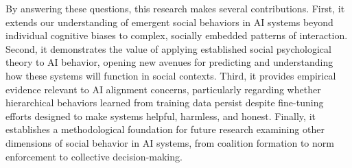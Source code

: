 
By answering these questions, this research makes several contributions. First, it extends our understanding of emergent social behaviors in AI systems beyond individual cognitive biases to complex, socially embedded patterns of interaction. Second, it demonstrates the value of applying established social psychological theory to AI behavior, opening new avenues for predicting and understanding how these systems will function in social contexts. Third, it provides empirical evidence relevant to AI alignment concerns, particularly regarding whether hierarchical behaviors learned from training data persist despite fine-tuning efforts designed to make systems helpful, harmless, and honest. Finally, it establishes a methodological foundation for future research examining other dimensions of social behavior in AI systems, from coalition formation to norm enforcement to collective decision-making.
